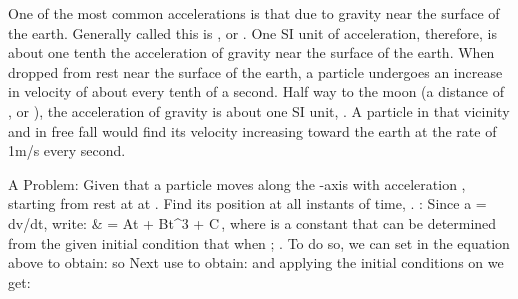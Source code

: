 {

One of the most common accelerations is that due to gravity near the surface
of the earth.
Generally called  this is , or .
One SI unit of acceleration, therefore, is about one tenth the acceleration
of gravity near the surface of the earth.
When dropped from rest near the surface of the earth, a particle undergoes
an increase in velocity of about  every tenth of a second.
Half way to the moon (a distance of , or ), the
acceleration of gravity is about one SI unit, .
A particle in that vicinity and in free fall would find its velocity
increasing toward the earth at the rate of 1\unit{m/s} every second.

 A Problem: Given that a particle moves along the -axis
with acceleration , starting from rest at  at
.
Find its position at all instants of time, .
\newline{}: Since a = dv/dt, write:
%
          {  & = At + Bt^3 + C\,,}
%
where  is a constant that can be determined from the given initial
condition that  when ; .
To do so, we can set  in the equation above to obtain:
%
%
so
%
%
Next use  to obtain:
%
%
and applying the initial conditions on  we get:
%
%
}%
%

